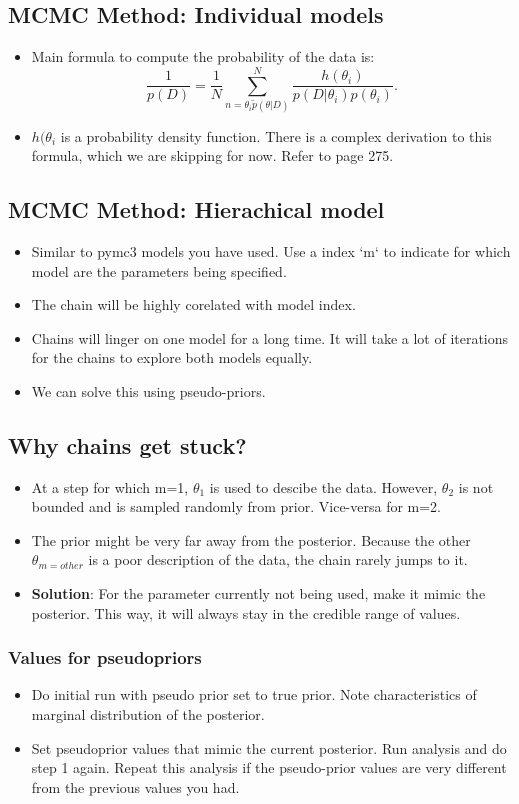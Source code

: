 \documentclass{article}
\begin{document}
\subsection{MCMC Method: Individual models}
\begin{itemize}
    \item Main formula to compute the probability of the data is:
    \[
        \frac{1}{p(D)} = \frac{1}{N} \sum_{n=\theta_{i} \tilde p(\theta|D)}^{N} \frac{h(\theta_{i})}{p(D|\theta_{i}) p(\theta_{i})} 
    .\]     
\item $h(\theta_{i}$ is a probability density function. There is a complex derivation to this formula, which we are skipping for now. Refer to page 275.
\end{itemize}
\subsection{MCMC Method: Hierachical model}
\begin{itemize}
    \item Similar to pymc3 models you have used. Use a index `m` to indicate for which model are the parameters being specified.
    \item The chain will be highly corelated with model index. 
    \item Chains will linger on one model for a long time. It will take a lot of iterations for the chains to explore both models equally.
    \item We can solve this using pseudo-priors.
\end{itemize}

\subsection{Why chains get stuck?}
\begin{itemize}
    \item At a step for which m=1, $\theta_{1}$ is used to descibe the data. However, $\theta_{2}$ is not bounded and is sampled randomly from prior. Vice-versa for m=2. 
    \item The prior might be very far away from the posterior. Because the other $\theta_{m = other}$ is a poor description of the data, the chain rarely jumps to it.
    \item \textbf{Solution}: For the parameter currently not being used, make it mimic the posterior. This way, it will always stay in the credible range of values.
\end{itemize}
\subsubsection{Values for pseudopriors}
\begin{itemize}
    \item Do initial run with pseudo prior set to true prior. Note characteristics of marginal distribution of the posterior. 
    \item Set pseudoprior values that mimic the current posterior. Run analysis and do step 1 again. Repeat this analysis if the pseudo-prior values are very different from the previous values you had.
\end{itemize}
\end{document}

